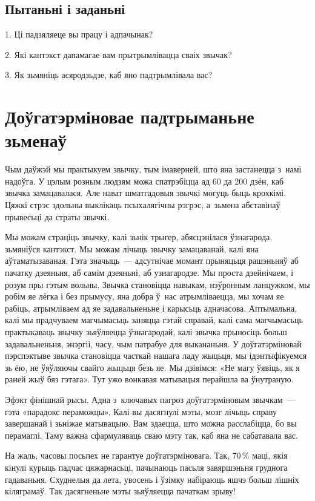 \subsection*{Пытаньні і заданьні}

1. Ці падзяляеце вы працу і адпачынак?

2. Які кантэкст дапамагае вам прытрымлівацца сваіх звычак?

3. Як зьмяніць асяродзьдзе, каб яно падтрымлівала вас?


\section{Доўгатэрміновае падтрыманьне зьменаў}

Чым даўжэй мы практыкуем звычку, тым імаверней, што яна застанецца з~намі надоўга. У цэлым розным людзям можа спатрэбіцца ад 60 да 200 дзён, каб звычка замацавалася. Але нават шматгадовыя звычкі могуць быць крохкімі. Цяжкі стрэс здольны выклікаць псыхалягічны рэгрэс, а~зьмена абставінаў прывесьці да страты звычкі. 

Мы можам страціць звычку, калі зьнік трыгер, абясцэнілася ўзнагарода, зьмяніўся кантэкст. Мы можам лічыць звычку замацаванай, калі яна аўтаматызаваная. Гэта значыць~--- адсутнічае момант прыняцьця рашэньняў аб пачатку дзеяньня, аб самім дзеяньні, аб узнагародзе. Мы проста дзейнічаем, і розум пры гэтым вольны. Звычка становіцца навыкам, нэўронным ланцужком, мы робім яе лёгка і без прымусу, яна добра ў~нас атрымліваецца, мы хочам яе рабіць, атрымліваем ад яе задавальненьне і карысьць адначасова. Аптымальна, калі мы прадчуваем магчымасьць заняцца гэтай справай, калі сама магчымасьць практыкаваць звычку зьяўляецца ўзнагародай, калі звычка прыносіць больш задавальненьня, энэргіі, часу, чым патрабуе для выкананьня. У доўгатэрміновай пэрспэктыве звычка становіцца часткай нашага ладу жыцьця, мы ідэнтыфікуемся зь ёю, не ўяўляючы свайго жыцьця безь яе. Мы дзівімся: «Не магу ўявіць, як я раней жыў бяз гэтага». Тут ужо вонкавая матывацыя перайшла ва ўнутраную.

Эфэкт фінішнай рысы. Адна з~ключавых пагроз доўгатэрміновым звычкам~--- гэта «парадокс пераможцы». Калі вы дасягнулі мэты, мозг лічыць справу завершанай і зьніжае матывацыю. Вам здаецца, што можна расслабіцца, бо вы перамаглі. Таму важна сфармуляваць сваю мэту так, каб яна не сабатавала вас.

На жаль, часовы посьпех не гарантуе доўгатэрміновага. Так, 70\,\% маці, якія кінулі курыць падчас цяжарнасьці, пачынаюць пасьля завяршэньня груднога гадаваньня. Схуднелыя да лета, увосень і ўзімку набіраюць яшчэ больш лішніх кіляграмаў. Так дасягненьне мэты зьяўляецца пачаткам зрыву!

